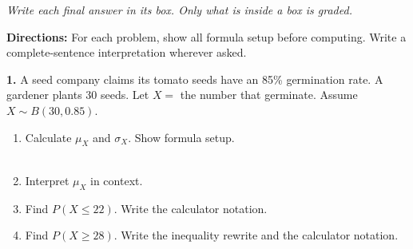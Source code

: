 \documentclass[10pt]{article}
\begin{document}
{\small\itshape Write each final answer in its box. Only what is inside a box is graded.}\par

\vspace{0.1in}

\begin{practicebox}
\small
\textbf{Directions:} For each problem, show all formula setup before computing.
Write a complete-sentence interpretation wherever asked.

\vspace{10pt}
\textbf{1.} A seed company claims its tomato seeds have an 85\% germination rate.
A gardener plants 30 seeds. Let $X =$ the number that germinate.
Assume $X \sim B(30, 0.85)$.
\begin{enumerate}[label=(\alph*), leftmargin=2em, itemsep=8pt]
  \item Calculate $\mu_X$ and $\sigma_X$. Show formula setup.\\
        \writeline\\[1pt]\writeline\gradedhide{\hrulefill}
  \item Interpret $\mu_X$ in context.\\
  \item Find $P(X \le 22)$. Write the calculator notation.\\
        \writeline\gradedhide{\hrulefill}\gradedright{\raisebox{-2pt}{\gradedblank[id=hw1c, type=short, points=1, answer=0.0698, check=numeric, tolerance=0.002]{1.3in}{0.2in}}}
  \item Find $P(X \ge 28)$. Write the inequality rewrite and the calculator notation.\\
        \writeline\\[1pt]\writeline\gradedhide{\hrulefill}\gradedright{\raisebox{-2pt}{\gradedblank[id=hw1d, type=short, points=2, answer=0.1514, check=numeric, tolerance=0.002]{1.3in}{0.2in}}}
\end{enumerate}


\end{practicebox}
\end{document}
